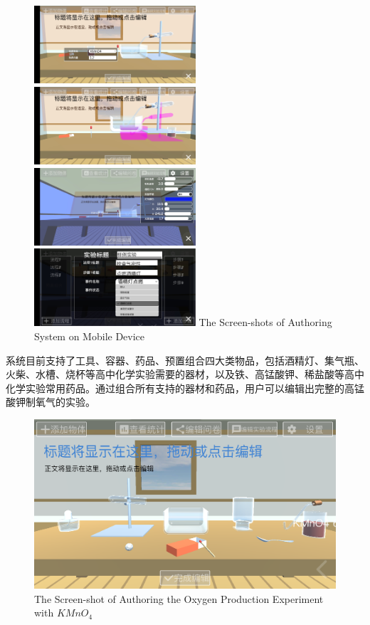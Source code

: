 \begin{figure}[!htp]
  \centering
  \includegraphics[width=6cm]{figure/objRes.jpg}
  \hspace{1cm}
    \includegraphics[width=6cm]{figure/movingRes.jpg}
    \includegraphics[width=6cm]{figure/envirRes.jpg}
  \hspace{1cm}
  \includegraphics[width=6cm]{figure/procedureRes.jpg}
    {The Screen-shots of Authoring System on Mobile Device}
 \label{fig:authorRes}
\end{figure}

系统目前支持了工具、容器、药品、预置组合四大类物品，包括酒精灯、集气瓶、火柴、水槽、烧杯等高中化学实验需要的器材，以及铁、高锰酸钾、稀盐酸等高中化学实验常用药品。通过组合所有支持的器材和药品，用户可以编辑出完整的高锰酸钾制氧气的实验。

\begin{figure}[!htp]
  \centering
  \includegraphics[width=12cm]{figure/Kmno4res.png}
    {The Screen-shot of Authoring the Oxygen Production Experiment with $KMnO_4$}
 \label{fig:authorRes}
\end{figure}


